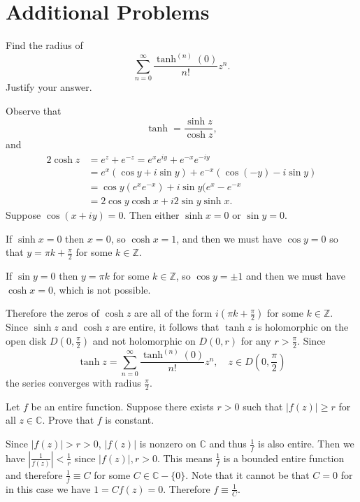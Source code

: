 \documentclass{article}
\newcounter{Problem}
\newenvironment{Problem}{\begin{Exercise}[name={Problem},
                                          counter={Problem}]}
                        {\end{Exercise}}
\begin{document}
\section{Additional Problems}
\begin{Problem}
Find the radius of
$$
\sum_{n=0}^\infty \frac{\tanh^{(n)}(0)}{n!} z^n.
$$
Justify your answer.
\end{Problem}

\begin{Answer}
Observe that
$$
\tanh = \frac{\sinh z}{\cosh z},
$$
and
\begin{align*}
   2\cosh z
&= e^z + e^{-z} = e^x e^{iy} + e^{-x} e^{-iy} \\
&= e^x (\cos y + i \sin y) + e^{-x} (\cos (-y) - i \sin y) \\
&= \cos y (e^x e^{-x}) + i \sin y (e^x - e^{-x} \\
&= 2 \cos y \cosh x + i 2 \sin y \sinh x.
\end{align*}
Suppose $\cos (x + iy) = 0$. Then either
$\sinh x = 0$ or $\sin y = 0$.

If $\sinh x = 0$ then $x = 0$, so $\cosh x = 1$,
and then we must have
$\cos y = 0$ so that
$y = \pi k + \frac{\pi}{2}$ for some $k \in \mathbb{Z}$.

If $\sin y = 0$ then $y = \pi k$ for some $k \in \mathbb{Z}$,
so $\cos y = \pm 1$ and then we must have $\cosh x = 0$, which is
not possible.

Therefore the zeros of $\cosh z$ are all of the form
$i \left( \pi k + \frac{\pi}{2} \right)$ for some $k \in \mathbb{Z}$.
Since $\sinh z$ and $\cosh z$ are entire, it follows that
$\tanh z$ is holomorphic on the open disk $D\left(0, \frac{\pi}{2}\right)$
and not holomorphic on $D(0, r)$ for any $r > \frac{\pi}{2}$.
Since
$$
\tanh z = \sum_{n=0}^\infty \frac{\tanh^{(n)}(0)}{n!} z^n, \quad
z \in D\left(0, \frac{\pi}{2}\right)
$$
the series converges with radius $\frac{\pi}{2}$.
\end{Answer}

\begin{Problem}
Let $f$ be an entire function. Suppose there exists $r > 0$ such that
$|f(z)| \geq r$ for all $z \in \mathbb{C}$. Prove that $f$ is constant.
\end{Problem}

\begin{Answer}
Since $|f(z)| > r > 0$, $|f(z)|$ is nonzero on $\mathbb{C}$ and thus
$\frac{1}{f}$ is also entire. Then we have
$\left|\frac{1}{f(z)}\right| < \frac{1}{r}$ since $|f(z)|, r > 0$.
This means $\frac{1}{f}$ is a bounded entire function and therefore
$\frac{1}{f} \equiv C$ for some $C \in \mathbb{C} - \{ 0 \}$.
Note that it cannot be that $C = 0$ for in this case we have
$1 = C f(z) = 0$. Therefore $f \equiv \frac{1}{C}$.
\end{Answer}
\end{document}
